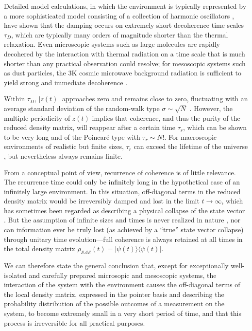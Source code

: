 \documentclass[twocolumn,rmp,aps,amsmath,amsfonts,noshowkeys,noshowpacs]{revtex4}
\newcommand{\ket}[1]{\ensuremath{|{#1\rangle}}}
\newcommand{\bra}[1]{\ensuremath{{\langle #1}|}}
\begin{document}
Detailed model calculations, in which the environment is typically
represented by a more sophisticated model consisting of a collection
of harmonic oscillators
\citep{Zurek:1993:qq,Zurek:2002:ii,Joos:2003:jh,Caldeira:1983:on,Unruh:1989:rc,Hu:1992:om},
have shown that the damping occurs on extremely short decoherence time
scales $\tau_D$, which are typically many orders of magnitude shorter
than the thermal relaxation. Even microscopic systems such as large
molecules are rapidly decohered by the interaction with thermal
radiation on a time scale that is much shorter than any practical
observation could resolve; for mesoscopic systems such as dust
particles, the 3K cosmic microwave background radiation is sufficient
to yield strong and immediate decoherence
\citep{Joos:1985:iu,Zurek:1991:vv}.

Within $\tau_D$, $|z(t)|$ approaches zero and remains close to zero,
fluctuating with an average standard deviation of the random-walk type
$\sigma \sim \sqrt{N}$ \citep{Zurek:1982:tv}. However, the multiple
periodicity of $z(t)$ implies that coherence, and thus the purity of
the reduced density matrix, will reappear after a certain time
$\tau_r$, which can be shown to be very long and of the Poincar\'e
type with $\tau_r \sim N!$. For macroscopic environments of realistic
but finite sizes, $\tau_r$ can exceed the lifetime of the universe
\citep{Zurek:1982:tv}, but nevertheless always remains finite.

From a conceptual point of view, recurrence of coherence is of little
relevance. The recurrence time could only be infinitely long in the
hypothetical case of an infinitely large environment. In this
situation, off-diagonal terms in the reduced density matrix would be
irreversibly damped and lost in the limit $t \rightarrow \infty$,
which has sometimes been regarded as describing a physical collapse of
the state vector \citep{Hepp:1972:pa}. But the assumption of infinite
sizes and times is never realized in nature \citep{Bell:1975:oi}, nor
can information ever be truly lost (as achieved by a ``true'' state
vector collapse) through unitary time evolution---full coherence is
always retained at all times in the total density matrix
$\rho_\mathcal{SAE}(t)=\ket{\psi(t)} \bra{\psi(t)}$.

We can therefore state the general conclusion that, except for
exceptionally well-isolated and carefully prepared microsopic and
mesoscopic systems, the interaction of the system with the environment
causes the off-diagonal terms of the local density matrix, expressed
in the pointer basis and describing the probability distribution of
the possible outcomes of a measurement on the system, to become
extremely small in a very short period of time, and that this process
is irreversible for all practical purposes.
\end{document}
